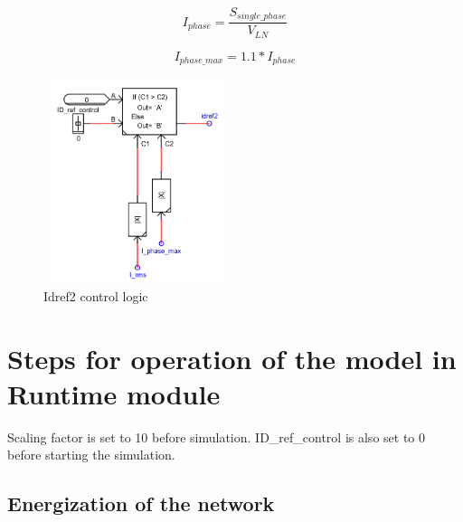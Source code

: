 \begin{equation}
    I_{phase} = \frac{S_{single\_phase}}{V_{LN}}
\end{equation}

\begin{equation}\label{i_phase_max_eq}
    I_{phase\_max} = 1.1 * I_{phase}
\end{equation}

\begin{figure}[H]
\centering
    \includegraphics[height = 6cm,width = 5.5cm]{Diagrams/Chapter_4/Idref_control.PNG}
    \caption{Idref2 control logic}
    \label{fig:Idref_control}
\end{figure}

\section{Steps for operation of the model in Runtime module}\label{steps_energ_appen}

Scaling factor is set to 10 before simulation.
ID\_ref\_control is also set to 0 before starting the simulation.

\subsection{Energization of the network}\label{energ_appendix}

